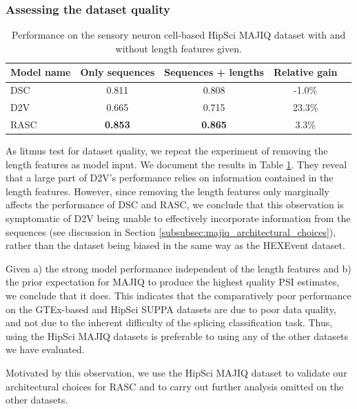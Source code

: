 \subsubsection{Assessing the dataset quality}

\begin{table}[h!]
	\centering
	\begin{tabular}{| l | c | c | c| c} 
		\hline
		Model name & Only sequences & Sequences + lengths & Relative gain\\
		\hline
		DSC & 0.811 & 0.808 & -1.0\%\\
		D2V & 0.665 & 0.715 & 23.3\%\\
		RASC & \textbf{0.853} & \textbf{0.865} & 3.3\%\\
		\hline
	\end{tabular}
	\caption{
		Performance on the sensory neuron cell-based HipSci MAJIQ dataset with and without length features given. 
	}
	\label{table:majiq_nolens}
\end{table}

As litmus test for dataset quality, we repeat the experiment of removing the length features as model input. We document the results in Table \ref{table:majiq_nolens}.
They reveal that a large part of D2V's performance relies on information contained in the length features. However, since removing the length features only marginally affects the performance of DSC and RASC, we conclude that this observation is symptomatic of D2V being unable to effectively incorporate information from the sequences (see discussion in Section \ref{subsubsec:majiq_architectural_choices}), rather than the dataset being biased in the same way as the HEXEvent dataset.  

Given a) the strong model performance independent of the length features and b) the prior expectation for MAJIQ to produce the highest quality PSI estimates, we conclude that it does. This indicates that the comparatively poor performance on the GTEx-based and HipSci SUPPA datasets are due to poor data quality, and not due to the inherent difficulty of the splicing classification task. Thus, using the HipSci MAJIQ datasets is preferable to using any of the other datasets we have evaluated. 

Motivated by this observation, we use the HipSci MAJIQ dataset to validate our architectural choices for RASC and to carry out further analysis omitted on the other datasets.





